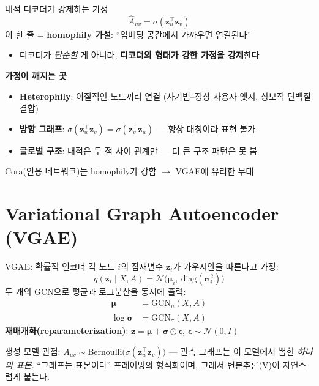 \begin{frame}{내적 디코더가 강제하는 가정}
\begin{equation*}
  \hat{A}_{uv} = \sigma(\mathbf{z}_u^\top \mathbf{z}_v)
\end{equation*}
이 한 줄 = \textbf{homophily 가설}: ``임베딩 공간에서 가까우면 연결된다''
\begin{itemize}
  \item 디코더가 \emph{단순한} 게 아니라, \textbf{디코더의 형태가 강한 가정을 강제}한다
\end{itemize}
\vspace{0.3em}
\textbf{가정이 깨지는 곳}
\begin{itemize}
  \item \textbf{Heterophily}: 이질적인 노드끼리 연결 (사기범--정상 사용자 엣지, 상보적 단백질 결합)
  \item \textbf{방향 그래프}: $\sigma(\mathbf{z}_u^\top \mathbf{z}_v) = \sigma(\mathbf{z}_v^\top \mathbf{z}_u)$ — 항상 대칭이라 표현 불가
  \item \textbf{글로벌 구조}: 내적은 두 점 사이 관계만 — 더 큰 구조 패턴은 못 봄
\end{itemize}
\vspace{0.3em}
Cora(인용 네트워크)는 homophily가 강함 $\to$ VGAE에 유리한 무대
\end{frame}

\section{Variational Graph Autoencoder (VGAE)}

\begin{frame}{VGAE: 확률적 인코더}
각 노드 $i$의 잠재변수 $\mathbf{z}_i$가 가우시안을 따른다고 가정:
\begin{equation*}
  q(\mathbf{z}_i \mid X, A) = \mathcal{N}\bigl(\bm{\mu}_i,\ \mathrm{diag}(\bm{\sigma}_i^2)\bigr)
\end{equation*}
두 개의 GCN으로 평균과 로그분산을 동시에 출력:
\begin{align*}
  \bm{\mu}        &= \mathrm{GCN}_{\mu}(X, A) \\
  \log \bm{\sigma} &= \mathrm{GCN}_{\sigma}(X, A)
\end{align*}
\textbf{재매개화(reparameterization)}: $\mathbf{z} = \bm{\mu} + \bm{\sigma}\odot \bm{\epsilon}$, $\bm{\epsilon}\sim\mathcal{N}(0,I)$
\vspace{0.4em}

\footnotesize
생성 모델 관점: $A_{uv} \sim \mathrm{Bernoulli}\bigl(\sigma(\mathbf{z}_u^\top\mathbf{z}_v)\bigr)$ — 관측 그래프는 이 모델에서 뽑힌 \emph{하나의 표본}. ``그래프는 표본이다'' 프레이밍의 형식화이며, 그래서 변분추론(V)이 자연스럽게 붙는다.
\end{frame}

